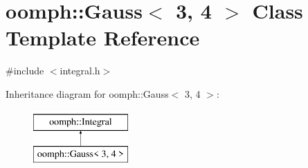 \hypertarget{classoomph_1_1Gauss_3_013_00_014_01_4}{}\section{oomph\+:\+:Gauss$<$ 3, 4 $>$ Class Template Reference}
\label{classoomph_1_1Gauss_3_013_00_014_01_4}


{\ttfamily \#include $<$integral.\+h$>$}

Inheritance diagram for oomph\+:\+:Gauss$<$ 3, 4 $>$\+:\begin{figure}[H]
\begin{center}
\leavevmode
\includegraphics[height=2.000000cm]{classoomph_1_1Gauss_3_013_00_014_01_4}
\end{center}
\end{figure}
